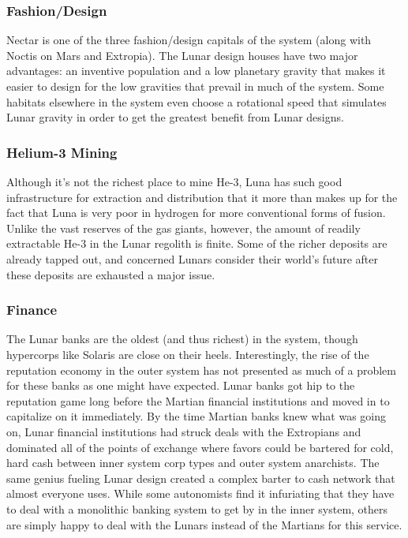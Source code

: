 \subsubsection{Fashion/Design}

Nectar is one of the three fashion/design capitals of 
the system (along with Noctis on Mars and Extropia). 
The Lunar design houses have two major advantages: 
an inventive population and a low planetary gravity 
that makes it easier to design for the low gravities that 
prevail in much of the system. Some habitats elsewhere 
in the system even choose a rotational speed that 
simulates Lunar gravity in order to get the greatest 
benefit from Lunar designs.

\subsubsection{Helium-3 Mining}

Although it's not the richest place to mine He-3, Luna 
has such good infrastructure for extraction and distribution that it more than makes up for the fact that 
Luna is very poor in hydrogen for more conventional 
forms of fusion. Unlike the vast reserves of the gas 
giants, however, the amount of readily extractable 
He-3 in the Lunar regolith is finite. Some of the richer 
deposits are already tapped out, and concerned Lunars 
consider their world's future after these deposits are 
exhausted a major issue.

\subsubsection{Finance}

The Lunar banks are the oldest (and thus richest) in 
the system, though hypercorps like Solaris are close 
on their heels. Interestingly, the rise of the reputation 
economy in the outer system has not presented as 
much of a problem for these banks as one might have 
expected. Lunar banks got hip to the reputation game 
long before the Martian financial institutions and 
moved in to capitalize on it immediately. By the time 
Martian banks knew what was going on, Lunar financial institutions had struck deals with the Extropians 
and dominated all of the points of exchange where 
favors could be bartered for cold, hard cash between 
inner system corp types and outer system anarchists. 
The same genius fueling Lunar design created a complex barter to cash network that almost everyone 
uses. While some autonomists find it infuriating that 
they have to deal with a monolithic banking system 
to get by in the inner system, others are simply happy 
to deal with the Lunars instead of the Martians for 
this service.

